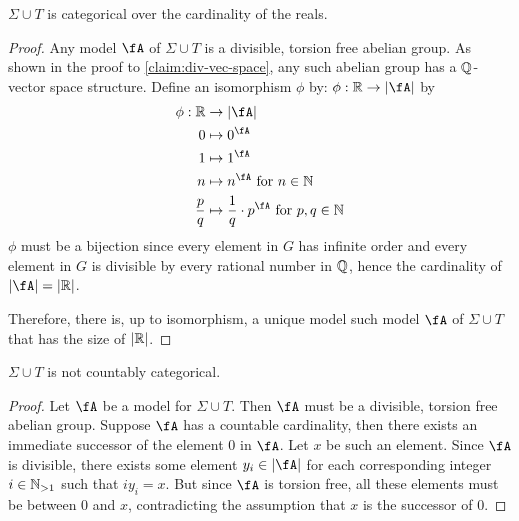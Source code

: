 \begin{claim}
  $\Sigma \cup T$ is categorical over the cardinality of the reals.

  \begin{proof}
    Any model $\fA$ of $\Sigma \cup T$ is a divisible,
    torsion free abelian group.
    As shown in the proof to \ref{claim:div-vec-space},
    any such abelian group has a $\mathbb{Q}$-vector space structure.
    Define an isomorphism $\phi$ by: $\phi : \R \to \abs{\fA}$ by
    \begin{align*}
      \phi : \R &\to \abs{\fA} \\
      0 &\mapsto 0^\fA \\
      1 &\mapsto 1^\fA \\
      n &\mapsto n^\fA \text{ for } n \in \N \\
      \frac{p}{q} &\mapsto \frac{1}{q} \cdot p^\fA \text{ for } p, q \in \N
    \end{align*}
    $\phi$ must be a bijection since every element in $G$ has infinite order
    and every element in $G$ is divisible by every rational number in $\mathbb{Q}$,
    hence the cardinality of $\abs{\fA} = \abs{\R}$.

    Therefore, there is, up to isomorphism, a unique model such model
    $\fA$ of $\Sigma \cup T$ that has the size of $\lvert\mathbb{R}\rvert$.
  \end{proof}
\end{claim}

\begin{claim}
  $\Sigma \cup T$ is not countably categorical.


  \begin{proof}
    Let $\fA$ be a model for $\Sigma \cup T$.
    Then $\fA$ must be a divisible, torsion free abelian group.
    Suppose $\fA$ has a countable cardinality, then there exists an immediate successor
    of the element $0$ in $\fA$. Let $x$ be such an element.
    Since $\fA$ is divisible, there exists some element $y_i \in \abs{\fA}$
    for each corresponding integer $i \in \mathbb{N}_{> 1}$ such that $i y_i = x$.
    But since $\fA$ is torsion free, all these elements must be between
    $0$ and $x$, contradicting the assumption that $x$ is the successor of $0$.
  \end{proof}
\end{claim}


\bigskip

